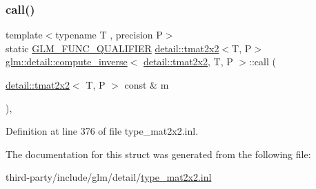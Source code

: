 \subsubsection{\texorpdfstring{call()}{call()}}
{\footnotesize\ttfamily template$<$typename T , precision P$>$ \\
static \hyperlink{setup_8hpp_a33fdea6f91c5f834105f7415e2a64407}{G\+L\+M\+\_\+\+F\+U\+N\+C\+\_\+\+Q\+U\+A\+L\+I\+F\+I\+ER} \hyperlink{structglm_1_1detail_1_1tmat2x2}{detail\+::tmat2x2}$<$T, P$>$ \hyperlink{structglm_1_1detail_1_1compute__inverse}{glm\+::detail\+::compute\+\_\+inverse}$<$ \hyperlink{structglm_1_1detail_1_1tmat2x2}{detail\+::tmat2x2}, T, P $>$\+::call (\begin{DoxyParamCaption}\item[{\hyperlink{structglm_1_1detail_1_1tmat2x2}{detail\+::tmat2x2}$<$ T, P $>$ const \&}]{m }\end{DoxyParamCaption})\hspace{0.3cm}{\ttfamily [inline]}, {\ttfamily [static]}}



Definition at line 376 of file type\+\_\+mat2x2.\+inl.



The documentation for this struct was generated from the following file\+:\begin{DoxyCompactItemize}
\item 
third-\/party/include/glm/detail/\hyperlink{type__mat2x2_8inl}{type\+\_\+mat2x2.\+inl}\end{DoxyCompactItemize}
